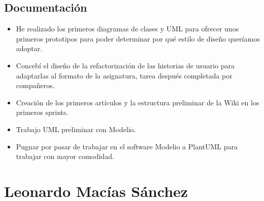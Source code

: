 \documentclass{article}
\begin{document}
\subsection*{Documentación}
\begin{itemize}
\item He realizado los primeros diagramas de clases y UML para ofrecer unos primeros prototipos para poder determinar por qué estilo de diseño queríamos adoptar.
\item Concebí el diseño de la refactorización de las historias de usuario para adaptarlas al formato de la asignatura, tarea después completada por compañeros.
\item Creación de los primeros artículos y la estructura preliminar de la Wiki en los primeros sprints.
\item Trabajo UML preliminar con Modelio.
\item Pugnar por pasar de trabajar en el software Modelio a PlantUML para trabajar con mayor comodidad.
\end{itemize}

\section*{Leonardo Macías Sánchez}
\end{document}
